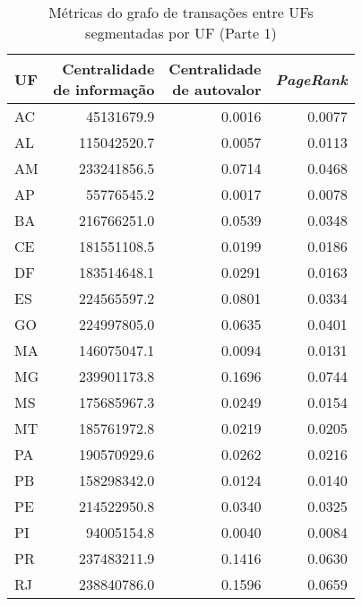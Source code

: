 \begin{table}[htb]
\centering
\caption{Métricas do grafo de transações entre UFs segmentadas por UF (Parte 1)}
\label{tab:metricas-redes:grafo-por-uf-especificas1}
    \begin{tabular}{l|rrr}
    \toprule
    UF &  \shortstack{Centralidade\\de informação} &  \shortstack{Centralidade\\de autovalor} &  \textit{PageRank} \\
    \midrule
    AC &           45131679.9 &                  0.0016 &    0.0077 \\
    AL &          115042520.7 &                  0.0057 &    0.0113 \\
    AM &          233241856.5 &                  0.0714 &    0.0468 \\
    AP &           55776545.2 &                  0.0017 &    0.0078 \\
    BA &          216766251.0 &                  0.0539 &    0.0348 \\
    CE &          181551108.5 &                  0.0199 &    0.0186 \\
    DF &          183514648.1 &                  0.0291 &    0.0163 \\
    ES &          224565597.2 &                  0.0801 &    0.0334 \\
    GO &          224997805.0 &                  0.0635 &    0.0401 \\
    MA &          146075047.1 &                  0.0094 &    0.0131 \\
    MG &          239901173.8 &                  0.1696 &    0.0744 \\
    MS &          175685967.3 &                  0.0249 &    0.0154 \\
    MT &          185761972.8 &                  0.0219 &    0.0205 \\
    PA &          190570929.6 &                  0.0262 &    0.0216 \\
    PB &          158298342.0 &                  0.0124 &    0.0140 \\
    PE &          214522950.8 &                  0.0340 &    0.0325 \\
    PI &           94005154.8 &                  0.0040 &    0.0084 \\
    PR &          237483211.9 &                  0.1416 &    0.0630 \\
    RJ &          238840786.0 &                  0.1596 &    0.0659 \\

\end{tabular}
\end{table}
